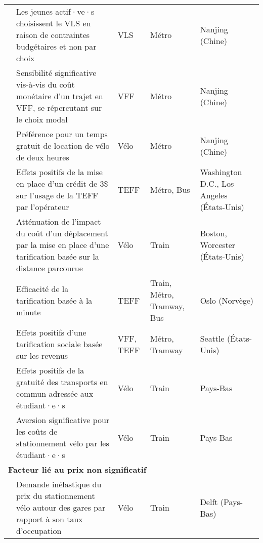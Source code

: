 \begin{longtable}{p{3cm}p{4cm}p{1.5cm}p{1.8cm}p{2.3cm}}
    \small{\textcite{liu_understanding_2020}}\index{Liu, Yang|pagebf} & \small{Les jeunes actif·ve·s choisissent le VLS en raison de contraintes budgétaires et non par choix} & \small{VLS} & \small{Métro} & \small{Nanjing (Chine)}\\
    \small{\textcite{zhong_layout_2021}}\index{Zhong, Hongming|pagebf} & \small{Sensibilité significative vis-à-vis du coût monétaire d'un trajet en VFF, se répercutant sur le choix modal} & \small{VFF} & \small{Métro} & \small{Nanjing (Chine)}\\
    \small{\textcite{chen_determinants_2012}}\index{Chen, Lijun|pagebf} & \small{Préférence pour un temps gratuit de location de vélo de deux heures} & \small{Vélo} & \small{Métro} & \small{Nanjing (Chine)}\\
    \small{\textcite{yan_evaluating_2023}}\index{Yan, Xiang|pagebf} & \small{Effets positifs de la mise en place d'un crédit de 3\$ sur l'usage de la TEFF par l'opérateur} & \small{TEFF} & \small{Métro, Bus} & \small{Washington D.C., Los Angeles (États-Unis)}\\
    \small{\textcite{fournier_continuous_2021}}\index{Fournier, Nicholas|pagebf} & \small{Atténuation de l'impact du coût d'un déplacement par la mise en place d'une tarification basée sur la distance parcourue} & \small{Vélo} & \small{Train} & \small{Boston, Worcester (États-Unis)}\\
    \small{\textcite{fearnley_patterns_2020}}\index{Fearnley, Nils|pagebf} & \small{Efficacité de la tarification basée à la minute} & \small{TEFF} & \small{Train, Métro, Tramway, Bus} & \small{Oslo (Norvège)}\\
    \small{\textcite{beale_integrating_2023}}\index{Beale, Kirsten|pagebf} & \small{Effets positifs d'une tarification sociale basée sur les revenus} & \small{VFF, TEFF} & \small{Métro, Tramway} & \small{Seattle (États-Unis)}\\
    \small{\textcite{givoni_access_2007}}\index{Givoni, Moshe|pagebf} & \small{Effets positifs de la gratuité des transports en commun adressée aux étudiant·e·s} & \small{Vélo} & \small{Train} & \small{Pays-Bas}\\
    \small{\textcite{van_mil_insights_2020}}\index{van Mil, Joeri F.P.|pagebf} & \small{Aversion significative pour les coûts de stationnement vélo par les étudiant·e·s} & \small{Vélo} & \small{Train} & \small{Pays-Bas}\\
    \hline
\multicolumn{5}{l}{\textbf{Facteur lié au prix non significatif}}\\
    \small{\textcite{molin_bicycle_2015}}\index{Molin, Eric|pagebf} & \small{Demande inélastique du prix du stationnement vélo autour des gares par rapport à son taux d'occupation} & \small{Vélo} & \small{Train} & \small{Delft (Pays-Bas)}\\

\end{longtable}

